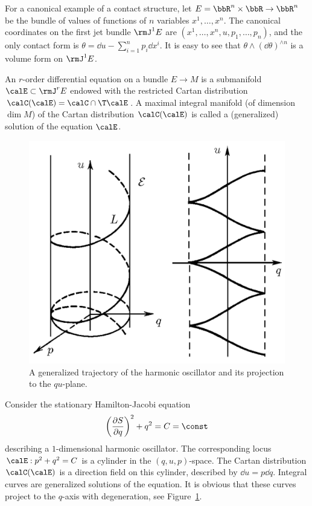 \begin{example}
    For a canonical example of a contact structure, let $E=\bbR^n\times \bbR\to \bbR^n$ be the bundle of values of functions of $n$ variables $x^1,\ldots,x^n$. The canonical coordinates on the first jet bundle $\rmJ^1 E$ are $(x^1,\ldots,x^n,u,p_1,\ldots,p_n)$, and the only contact form is $\theta=\dd u-\sum_{i=1}^n p_i\dd x^i$. It is easy to see that $\theta\wedge(\dd\theta)^{\wedge n}$ is a volume form on $\rmJ^1 E$. 
\end{example}

\begin{defn}
    An $r$-order differential equation on a bundle $E\to M$ is a submanifold $\calE\subset \rmJ^r E$ endowed with the restricted Cartan distribution $\calC(\calE)=\calC\cap \T \calE$. A maximal integral manifold (of dimension $\dim M$) of the Cartan distribution $\calC(\calE)$ is called a (generalized) solution of the equation $\calE$.
\end{defn}

\begin{figure}[tp]
    \centering
    \includegraphics[scale=0.5]{figures/oscillator.png}
    \caption{A generalized trajectory of the harmonic oscillator and its projection to the $qu$-plane.}
    \label{fig:oscillator}
\end{figure}

\begin{example}
    Consider the stationary Hamilton-Jacobi equation 
    \[\left(\frac{\partial S}{\partial q}\right)^2+q^2=C=\const\]
    describing a $1$-dimensional harmonic oscillator. The corresponding locus $\calE:p^2+q^2=C$ is a cylinder in the $(q,u,p)$-space. The Cartan distribution $\calC(\calE)$ is a direction field on this cylinder, described by $\dd u=p\dd q$. Integral curves are generalized solutions of the equation. It is obvious that these curves project to the $q$-axis with degeneration, see Figure~\ref{fig:oscillator}.
\end{example}


